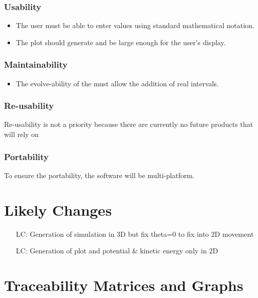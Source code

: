 \documentclass[12pt]{article}
\newcounter{lcnum} %
\begin{document}
\subsubsection*{Usability}
\begin{itemize}
\item The user must be able to enter values using standard mathematical 
notation.
\item The plot should generate and be large enough for 
the user's display.
\end{itemize}

\subsubsection*{Maintainability}
\begin{itemize}
	\item The evolve-ability of the \progname must allow the addition 
	of real intervals.
\end{itemize}

\subsubsection*{Re-usability}
Re-usability is not a priority because there are currently no future products 
that will rely on \progname

\subsubsection*{Portability}
To ensure the portability, the \progname software will be multi-platform.

\section{Likely Changes}    

\noindent \begin{itemize}

\item[LC\refstepcounter{lcnum}\thelcnum \label{only2dsim}:] Generation of 
simulation in 3D but fix theta=0 to fix into 2D movement
\item[LC\refstepcounter{lcnum}\thelcnum \label{only2dplot}:] Generation of 
plot and potential \& kinetic energy only in 2D

\end{itemize}

\section{Traceability Matrices and Graphs}
\end{document}

